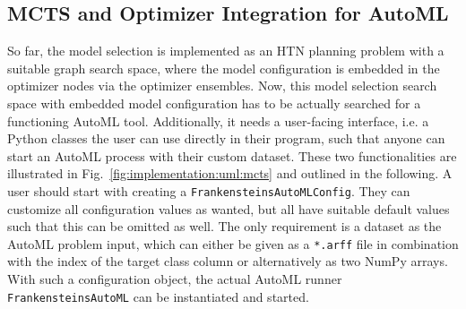 \subsection{MCTS and Optimizer Integration for AutoML}
\label{sec:implementation:components:mcts}
So far, the model selection is implemented as an HTN planning problem with a suitable graph search space, where the model configuration is embedded in the optimizer nodes via the optimizer ensembles.
Now, this model selection search space with embedded model configuration has to be actually searched for a functioning AutoML tool.
Additionally, it needs a user-facing interface, i.e. a Python classes the user can use directly in their program, such that anyone can start an AutoML process with their custom dataset.
These two functionalities are illustrated in Fig.~\ref{fig:implementation:uml:mcts} and outlined in the following.\newline
A user should start with creating a \texttt{FrankensteinsAutoMLConfig}.
They can customize all configuration values as wanted, but all have suitable default values such that this can be omitted as well.
The only requirement is a dataset as the AutoML problem input, which can either be given as a \texttt{*.arff} file in combination with the index of the target class column or alternatively as two NumPy arrays.
With such a configuration object, the actual AutoML runner \texttt{FrankensteinsAutoML} can be instantiated and started.

